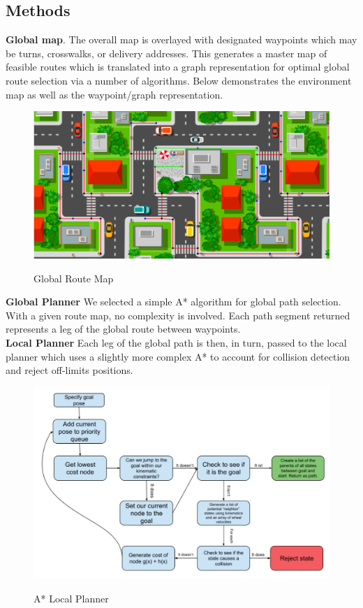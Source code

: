 \documentclass{article}
\begin{document}
\begin{multicols}{2}
\section*{Methods}
\noindent \textbf{Global map}.  The overall map is overlayed with designated waypoints which may be turns, crosswalks, or delivery addresses.  This generates a master map of feasible routes which is translated into a graph representation for optimal global route selection via a number of algorithms.  Below demonstrates the environment map as well as the waypoint/graph representation.\\
\begin{figure}[H]
   \centering
    \includegraphics[width = 1\columnwidth]{figures/routemap.png}
     \label{fig:routemap}
     \caption{Global Route Map}
\end{figure}
\noindent \textbf{Global Planner} We selected a simple A* algorithm for global path selection.  With a given route map, no complexity is involved.  Each path segment returned represents a leg of the global route between waypoints.  \\

\noindent \textbf{Local Planner} Each leg of the global path is then, in turn, passed to the local planner which uses a slightly more complex A* to account for collision detection and reject off-limits positions.  
\begin{figure}[H]
   \centering
    \includegraphics[width = 1\columnwidth]{figures/astar.png}
     \label{fig:astar}
     \caption{A* Local Planner}
\end{figure}


\end{multicols}
\end{document}
